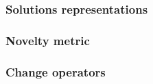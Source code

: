 \documentclass[conference]{IEEEtran}
\begin{document}
\subsubsection{Solutions representations}

\subsubsection{Novelty metric}
\subsubsection{Change operators}







%
%



%
%
\end{document}
